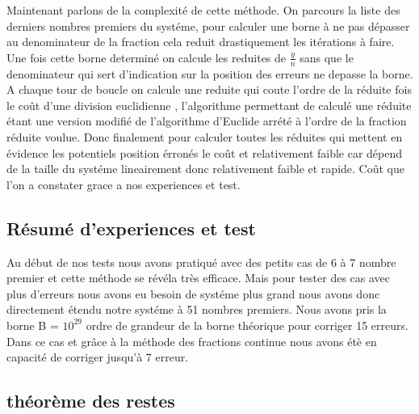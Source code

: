 \documentclass[a4paper, 11pt]{report}
\begin{document}
Maintenant parlons de la complexité de cette méthode. 
On parcours la liste des derniers nombres premiers du systéme, pour calculer une borne à ne pas dépasser au denominateur de la fraction cela reduit drastiquement les itérations à faire.
Une fois cette borne determiné on calcule les reduites de  $\frac{y}{n}$ sans que le denominateur qui sert d'indication sur la position des erreurs ne depasse la borne.
A chaque tour de boucle on calcule une reduite qui coute l'ordre de la réduite fois le coût d'une division euclidienne  ,
l'algorithme permettant de calculé une réduite étant une version modifié de l'algorithme d'Euclide arrété à l'ordre de la fraction réduite voulue.
Donc finalement pour calculer toutes les réduites qui mettent en évidence les potentiels position érronés le coût et relativement faible car dépend de la taille du systéme lineairement donc relativement faible et rapide.
Coût que l'on a constater grace a nos experiences et test.






\newpage
\section{Résumé d'experiences et test}
Au début de nos tests nous avons pratiqué avec des petits cas de 6 à 7 nombre premier et cette méthode se révéla très efficace.
Mais pour tester des cas avec plus d'erreurs nous avons eu besoin de systéme plus grand nous avons donc directement étendu notre systéme à 51 nombres premiers.
Nous avons pris la borne B = $10^{29}$ ordre de grandeur de la borne théorique pour corriger 15 erreurs.
Dans ce cas et grâce à la méthode des fractions continue nous avons étè en capacité de corriger jusqu'à 7 erreur.



\newpage

\begin{appendices}
    \chapter{théorème des restes}
    \label{a_encartage}


\end{appendices}
\end{document}
